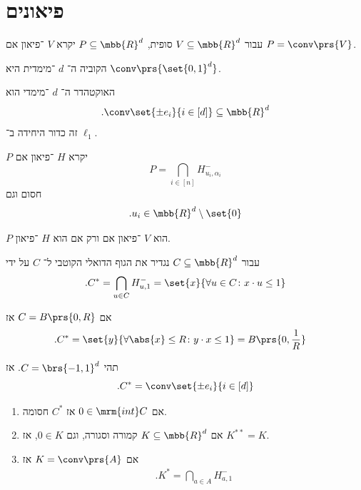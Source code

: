 \documentclass[a4paper,10pt,twoside,openany]{book}
\begin{document}
\chapter{פיאונים}

\begin{definition}
עבור
$V \subseteq \mbb{R}^d$
סופית,
$P \subseteq \mbb{R}^d$
יקרא
$V$%
־פיאון אם
$P = \conv\prs{V}$.
\end{definition}

\begin{example}
הקוביה ה־%
$d$%
־מימדית היא
$\conv\prs{\set{0,1}^d}$.
\end{example}

\begin{example}
האוקטהדר ה־%
$d$%
־מימדי הוא
\[\text{.} \conv\set{\pm e_i}{i \in [d]} \subseteq \mbb{R}^d\]
זה כדור היחידה ב־%
$\ell_1$.
\end{example}

\begin{definition}
$P$
יקרא
$H$%
־פיאון אם
\[P = \bigcap_{i \in [n]} H_{u_i, \alpha_i}^-\]
חסום וגם
\[\text{.} u_i \in \mbb{R}^d \setminus \set{0}\]
\end{definition}

\begin{proposition}\label{proposition:equivalent-polytope-definitions}
$P$
הוא
$V$%
־פיאון אם ורק אם הוא
$H$%
־פיאון.
\end{proposition}

\begin{definition}
עבור
$C \subseteq \mbb{R}^d$
נגדיר את הגוף הדואלי הקוטבי ל־%
$C$
על ידי
\begin{align*}
\text{.} C^* = \bigcap_{u \in C} H_{u,1}^- = \set{x}{\forall u \in C \colon x \cdot u \leq 1}
\end{align*}
\end{definition}

\begin{example}
אם
$C = B\prs{0,R}$
אז
\begin{align*}
\text{.} C^* &= \set{y}{\forall \abs{x} \leq R \colon y \cdot x \leq 1}
= B\prs{0,\frac{1}{R}}
\end{align*}
\end{example}

\begin{example}
תהי
$C = \brs{-1,1}^d$.
אז
\[\text{.} 
C^* = \conv\set{\pm e_i}{i \in [d]}\]
\end{example}

\begin{proposition}
\begin{enumerate}
\item אם
$0 \in \mrm{int}C$
אז
$C^*$
חסומה.
\item אם
$K \subseteq \mbb{R}^d$
קמורה וסגורה, וגם
$0 \in K$,
אז
$K^{**} = K$.
\item אם
$K = \conv\prs{A}$
אז
\begin{align*}
\text{.} K^* = \bigcap_{a \in A} H_{a,1}^-
\end{align*}
\end{enumerate}
\end{proposition}
\end{document}
